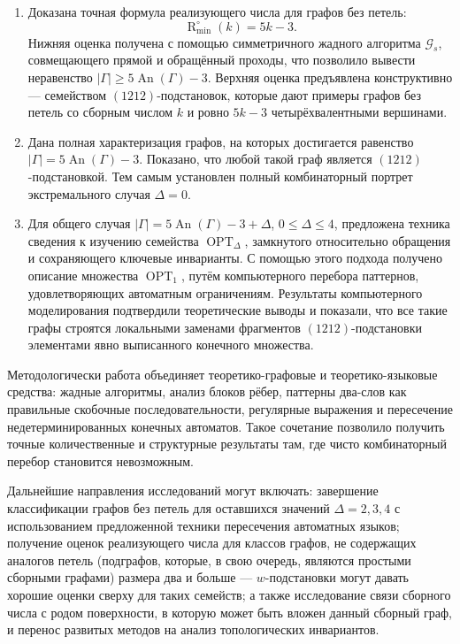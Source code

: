 \documentclass{article}
\theoremstyle{definition}
\newcommand{\An}{\operatorname{An}}
\newcommand{\OPT}{\operatorname{OPT}}
\newcommand{\D}{\Delta}
\newcommand{\Romin}{\operatorname{R}_{\min}^\circ}
\begin{document}
\begin{enumerate}
    \item Доказана точная формула реализующего числа для графов без петель:
    \[
    \Romin(k)=5k-3.
    \]
    Нижняя оценка получена с помощью симметричного жадного алгоритма $\mathcal{G}_s$, совмещающего прямой и обращённый проходы, что позволило вывести неравенство $|\Gamma|\ge 5\An(\Gamma)-3$. Верхняя оценка предъявлена конструктивно — семейством $(1212)$-подстановок, которые дают примеры графов без петель со сборным числом $k$ и ровно $5k-3$ четырёхвалентными вершинами.
    
    \item Дана полная характеризация графов, на которых достигается равенство $|\Gamma|=5\An(\Gamma)-3$. Показано, что любой такой граф является $(1212)$-подстановкой. Тем самым установлен полный комбинаторный портрет экстремального случая $\D=0$.
    
    \item Для общего случая $|\Gamma| = 5\An(\Gamma)-3+\D$, $0\le \D\le 4$, предложена техника сведения к изучению семейства $\OPT_\D$, замкнутого относительно обращения и сохраняющего ключевые инварианты. С помощью этого подхода получено описание множества $\OPT_1$, путём компьютерного перебора паттернов, удовлетворяющих автоматным ограничениям. Результаты компьютерного моделирования подтвердили теоретические выводы и показали, что все такие графы строятся локальными заменами фрагментов $(1212)$-подстановки элементами явно выписанного конечного множества.
\end{enumerate}

Методологически работа объединяет теоретико-графовые и теоретико-языковые средства: жадные алгоритмы, анализ блоков рёбер, паттерны два-слов как правильные скобочные последовательности, регулярные выражения и пересечение недетерминированных конечных автоматов. Такое сочетание позволило получить точные количественные и структурные результаты там, где чисто комбинаторный перебор становится невозможным.

Дальнейшие направления исследований могут включать: завершение классификации графов без петель для оставшихся значений $\D=2,3,4$ с использованием предложенной техники пересечения автоматных языков; получение оценок реализующего числа для классов графов, не содержащих аналогов петель (подграфов, которые, в свою очередь, являются простыми сборными графами) размера два и больше — $w$-подстановки могут давать хорошие оценки сверху для таких семейств; а также исследование связи сборного числа с родом поверхности, в которую может быть вложен данный сборный граф, и перенос развитых методов на анализ топологических инвариантов.
\end{document}
